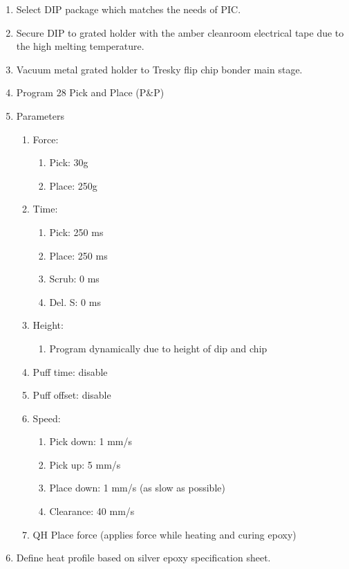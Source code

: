 \begin{enumerate}
     \item Select DIP package which matches the needs of PIC.
    \item Secure DIP to grated holder with the amber cleanroom electrical tape due to the high melting temperature.
    \item Vacuum metal grated holder to Tresky flip chip bonder main stage. 
    \item Program 28 Pick and Place (P\&P)
    \item Parameters
    \begin{enumerate}
        \item Force:
        \begin{enumerate}
            \item Pick: 30g
            \item Place: 250g
        \end{enumerate}
        \item Time:
        \begin{enumerate}
            \item Pick: 250 ms
            \item Place: 250 ms
            \item Scrub: 0 ms
            \item Del. S: 0 ms            
        \end{enumerate}
        \item Height:
        \begin{enumerate}
            \item Program dynamically due to height of dip and chip
        \end{enumerate}
        \item Puff time: disable
        \item Puff offset: disable
        \item Speed:
        \begin{enumerate}
            \item Pick down: 1 mm/s
            \item Pick up: 5 mm/s 
            \item Place down: 1 mm/s (as slow as possible)
            \item Clearance: 40 mm/s
        \end{enumerate}
        \item QH Place force (applies force while heating and curing epoxy)
    \end{enumerate}
    \item Define heat profile based on silver epoxy specification sheet. 

\end{enumerate}
